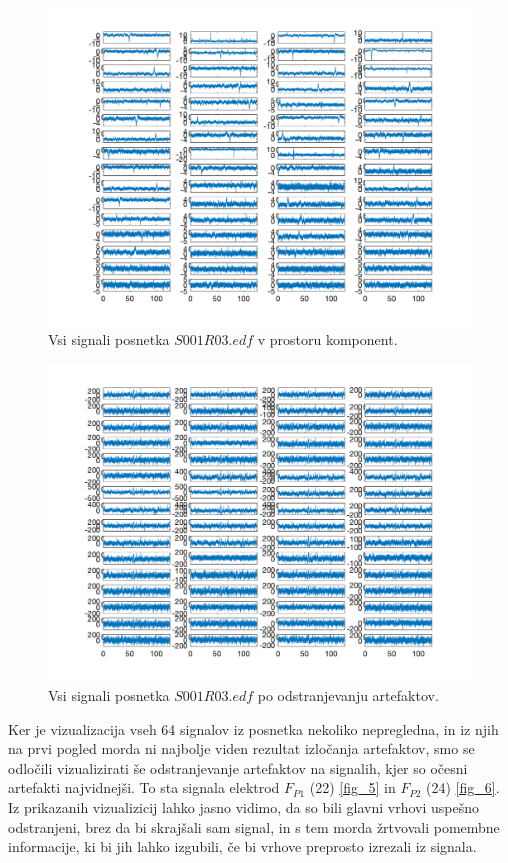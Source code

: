 \documentclass[9pt]{IEEEtran}
\begin{document}
\begin{figure}[!htb]
\centering
\includegraphics[width=1\columnwidth]{icasig_all.png}
\caption[c1]{ Vsi signali posnetka $S001R03.edf$ v prostoru komponent. }
\label{fig_9}
\end{figure}

\begin{figure}[!htb]
\centering
\includegraphics[width=1\columnwidth]{outsig_all.png}
\caption[c1]{ Vsi signali posnetka $S001R03.edf$ po odstranjevanju artefaktov. }
\label{fig_4}
\end{figure}

Ker je vizualizacija vseh 64 signalov iz posnetka nekoliko nepregledna, in iz njih na prvi pogled morda ni najbolje viden rezultat izločanja artefaktov, smo se odločili vizualizirati še odstranjevanje artefaktov na signalih, kjer so očesni artefakti najvidnejši. To sta signala elektrod $F_{P1}$ (22) \ref{fig_5} in $F_{P2}$ (24) \ref{fig_6}. Iz prikazanih vizualizicij lahko jasno vidimo, da so bili glavni vrhovi uspešno odstranjeni, brez da bi skrajšali sam signal, in s tem morda žrtvovali pomembne informacije, ki bi jih lahko izgubili, če bi vrhove preprosto izrezali iz signala.
\end{document}
